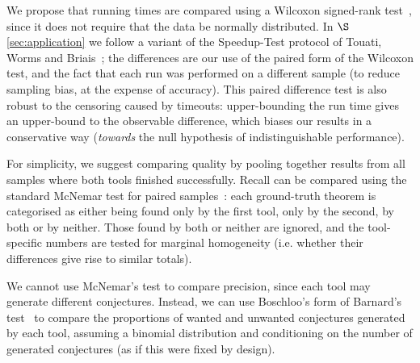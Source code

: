 We propose that running times are compared using a Wilcoxon signed-rank
test~\cite{wilcoxon1945individual}, since it does not require that the data be
normally distributed. In $\S$\ref{sec:application} we follow a variant of the
Speedup-Test protocol of Touati, Worms and Briais~\cite{touati2013speedup}; the
differences are our use of the paired form of the Wilcoxon test, and the fact
that each run was performed on a different sample (to reduce sampling bias, at
the expense of accuracy). This paired difference test is also robust to the
censoring caused by timeouts: upper-bounding the run time gives an upper-bound
to the observable difference, which biases our results in a conservative way
(\emph{towards} the null hypothesis of indistinguishable performance).

For simplicity, we suggest comparing quality by pooling together results from
all samples where both tools finished successfully. Recall can be compared using
the standard McNemar test for paired samples~\cite{mcnemar1947note}: each
ground-truth theorem is categorised as either being found only by the first
tool, only by the second, by both or by neither. Those found by both or neither
are ignored, and the tool-specific numbers are tested for marginal homogeneity
(i.e. whether their differences give rise to similar totals).

We cannot use McNemar's test to compare precision, since each tool may generate
different conjectures. Instead, we can use Boschloo's form of Barnard's
test~\cite{lydersen2009recommended} to compare the proportions of wanted and
unwanted conjectures generated by each tool, assuming a binomial distribution
and conditioning on the number of generated conjectures (as if this were fixed
by design).

